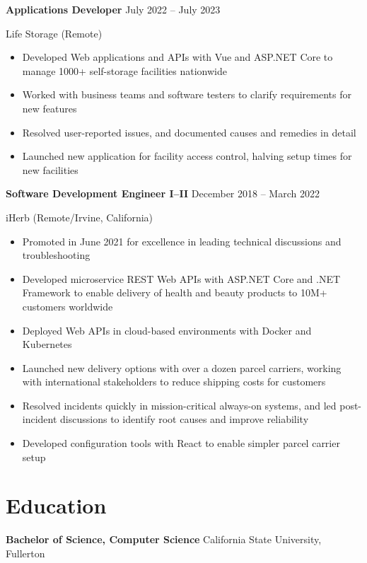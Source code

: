 \documentclass[12pt]{article}
\newcommand{\titleheader}[2]{\textbf{#1} \symbol{"B7} #2}
\newcommand{\locheader}[2]{#1 (#2)}
\begin{document}
	\titleheader{Applications Developer}{July 2022 -- July 2023}

	\locheader{Life Storage}{Remote}

	\begin{itemize}
		\item Developed Web applications and APIs with Vue and ASP.NET Core to manage 1000+ self-storage facilities nationwide
		\item Worked with business teams and software testers to clarify requirements for new features
		\item Resolved user-reported issues, and documented causes and remedies in detail
		\item Launched new application for facility access control, halving setup times for new facilities
	\end{itemize}

	\titleheader{Software Development Engineer I--II}{December 2018 -- March 2022}

	\locheader{iHerb}{Remote/Irvine, California}

	\begin{itemize}
		\item Promoted in June 2021 for excellence in leading technical discussions and troubleshooting
		\item Developed microservice REST Web APIs with ASP.NET Core and .NET Framework to enable delivery of health and beauty products to 10M+ customers worldwide
		\item Deployed Web APIs in cloud-based environments with Docker and Kubernetes
		\item Launched new delivery options with over a dozen parcel carriers, working with international stakeholders to reduce shipping costs for customers
		\item Resolved incidents quickly in mission-critical always-on systems, and led post-incident discussions to identify root causes and improve reliability
		\item Developed configuration tools with React to enable simpler parcel carrier setup
	\end{itemize}

	\section*{Education}

	\textbf{Bachelor of Science, Computer Science}  California State University, Fullerton
\end{document}
